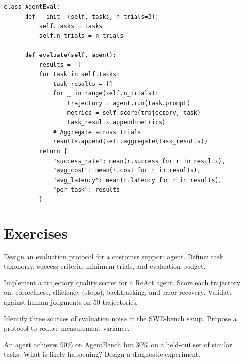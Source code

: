 \begin{lstlisting}[caption=Agent evaluation pipeline]
  class AgentEval:
      def __init__(self, tasks, n_trials=3):
          self.tasks = tasks
          self.n_trials = n_trials

      def evaluate(self, agent):
          results = []
          for task in self.tasks:
              task_results = []
              for _ in range(self.n_trials):
                  trajectory = agent.run(task.prompt)
                  metrics = self.score(trajectory, task)
                  task_results.append(metrics)
              # Aggregate across trials
              results.append(self.aggregate(task_results))
          return {
              "success_rate": mean(r.success for r in results),
              "avg_cost": mean(r.cost for r in results),
              "avg_latency": mean(r.latency for r in results),
              "per_task": results
          }
\end{lstlisting}

\section{Exercises}

\begin{exercise}
	Design an evaluation protocol for a customer support agent. Define: task taxonomy, success criteria, minimum trials, and evaluation budget.
\end{exercise}

\begin{exercise}
	Implement a trajectory quality scorer for a ReAct agent. Score each trajectory on: correctness, efficiency (steps), backtracking, and error recovery. Validate against human judgments on 50 trajectories.
\end{exercise}

\begin{exercise}
	Identify three sources of evaluation noise in the SWE-bench setup. Propose a protocol to reduce measurement variance.
\end{exercise}

\begin{exercise}
	An agent achieves 90\% on AgentBench but 30\% on a held-out set of similar tasks. What is likely happening? Design a diagnostic experiment.
\end{exercise}
